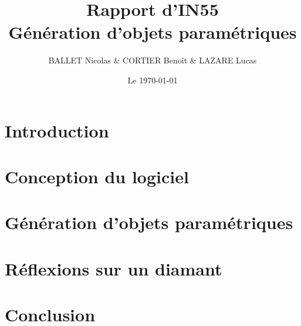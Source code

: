 \documentclass[a4paper, 12pt]{article}
\begin{document}
\title{Rapport d'IN55 \\ Génération d'objets paramétriques}
\author{BALLET Nicolas \& CORTIER Benoît \& LAZARE Lucas}
\date{Le \today}

\maketitle

\tableofcontents

\section{Introduction}

\section{Conception du logiciel}

\section{Génération d'objets paramétriques}

\section{Réflexions sur un diamant}

\section{Conclusion}
\end{document}
